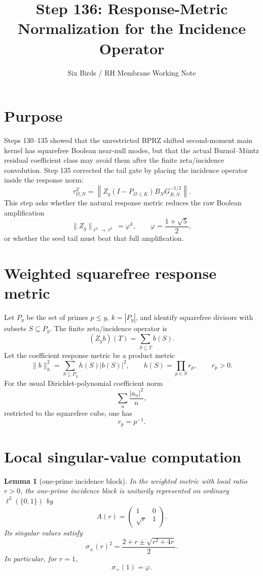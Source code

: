 \documentclass[11pt]{article}
\title{Step 136: Response-Metric Normalization for the Incidence Operator}
\author{Six Birds / RH Membrane Working Note}
\date{}
\newtheorem{lemma}{Lemma}
\begin{document}
\maketitle

\section{Purpose}
Steps 130--135 showed that the unrestricted BPRZ shifted second-moment main kernel has squarefree Boolean near-null modes, but that the actual Burnol--Müntz residual coefficient class may avoid them after the finite zeta/incidence convolution.  Step 135 corrected the tail gate by placing the incidence operator inside the response norm:
\[
\tau_{\Omega,N}^{Z}
=
\left\|Z_y(I-P_{\Omega\le K})B_NG_{B,N}^{-1/2}\right\|.
\]
This step asks whether the natural response metric reduces the raw Boolean amplification
\[
\|Z_y\|_{\ell^2\to\ell^2}=\varphi^k,
\qquad \varphi=\frac{1+\sqrt5}{2},
\]
or whether the seed tail must beat that full amplification.

\section{Weighted squarefree response metric}
Let $P_y$ be the set of primes $p\le y$, $k=|P_y|$, and identify squarefree divisors with subsets $S\subseteq P_y$.  The finite zeta/incidence operator is
\[
(Z_yb)(T)=\sum_{S\subseteq T}b(S).
\]
Let the coefficient response metric be a product metric
\[
\|b\|_h^2=\sum_{S\subseteq P_y}h(S)|b(S)|^2,
\qquad
h(S)=\prod_{p\in S} r_p,
\qquad r_p>0.
\]
For the usual Dirichlet-polynomial coefficient norm
\[
\sum_n \frac{|a_n|^2}{n},
\]
restricted to the squarefree cube, one has
\[
r_p=p^{-1}.
\]

\section{Local singular-value computation}
\begin{lemma}[one-prime incidence block]
In the weighted metric with local ratio $r>0$, the one-prime incidence block is unitarily represented on ordinary $\ell^2(\{0,1\})$ by
\[
A(r)=
\begin{pmatrix}
1&0\\
\sqrt r&1
\end{pmatrix}.
\]
Its singular values satisfy
\[
\sigma_\pm(r)^2=
\frac{2+r\pm\sqrt{r^2+4r}}{2}.
\]
In particular, for $r=1$,
\[
\sigma_+(1)=\varphi.
\]
\end{lemma}
\end{document}
